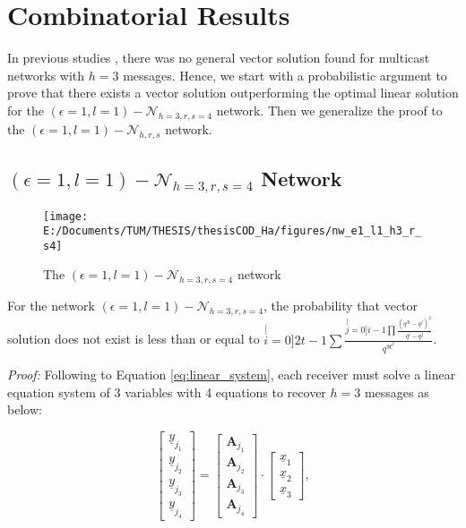 \chapter{Combinatorial Results} \label{chap:comb_res}

In previous studies \cite{Wachter-Zeh:2018}, there was no general
vector solution found for multicast networks with $h=3$ messages.
Hence, we start with a probabilistic argument to prove that there
exists a vector solution outperforming the optimal linear solution
for the $\left(\epsilon=1,l=1\right)-\mathcal{N}_{h=3,r,s=4}$ network.
Then we generalize the proof to the $\left(\epsilon=1,l=1\right)-\mathcal{N}_{h,r,s}$
network.

\section{$\left(\epsilon=1,l=1\right)-\mathcal{N}_{h=3,r,s=4}$ Network}

\begin{figure}[H]
\caption{The $(\epsilon=1,l=1)-\mathcal{N}_{h=3,r,s=4}$ network\label{fig:nw_e1_l1_h3_r_s4}}

\texttt{[image: E:/Documents/TUM/THESIS/thesisCOD\_Ha/figures/nw\_e1\_l1\_h3\_r\_s4]}
\end{figure}

\begin{conjecture}
For the network $\left(\epsilon=1,l=1\right)-\mathcal{N}_{h=3,r,s=4}$,
the probability that vector solution does not exist is less than or
equal to $\stackrel[i=0]{2t-1}{\mathop{\sum}}\frac{\stackrel[j=0]{i-1}{\mathop{\prod}}\frac{\left(q^{3t}-q^{j}\right)^{2}}{q^{i}-q^{j}}}{q^{9t^{2}}}$.
\end{conjecture}
\textit{Proof:} Following to Equation \ref{eq:linear_system}, each
receiver must solve a linear equation system of 3 variables with 4
equations to recover $h=3$ messages as below:

\[
\left[\begin{array}{c}
\underline{y}_{j_{1}}\\
\underline{y}_{j_{2}}\\
\underline{y}_{j_{3}}\\
\underline{y}_{j_{4}}
\end{array}\right]=\left[\begin{array}{c}
\boldsymbol{A}_{j_{1}}\\
\boldsymbol{A}_{j_{2}}\\
\boldsymbol{A}_{j_{3}}\\
\boldsymbol{A}_{j_{4}}
\end{array}\right]\cdot\left[\begin{array}{c}
\underline{x}_{1}\\
\underline{x}_{2}\\
\underline{x}_{3}
\end{array}\right],
\]


